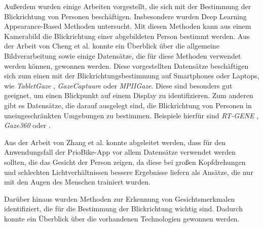 Außerdem wurden einige Arbeiten vorgestellt, die sich mit der Bestimmung der Blickrichtung von Personen beschäftigen. Insbesondere wurden Deep Learning Appearance-Based Methoden untersucht. Mit diesen Methoden kann aus einem Kamerabild die Blickrichtung einer abgebildeten Person bestimmt werden. Aus der Arbeit von Cheng et al. \cite{paper:basics:survey} konnte ein Überblick über die allgemeine Bildverarbeitung sowie einige Datensätze, die für diese Methoden verwendet werden können, gewonnen werden. Diese vorgestellten Datensätze beschäftigen sich zum einen mit der Blickrichtungsbestimmung auf Smartphones oder Laptops, wie \textit{TabletGaze} \cite{paper:tabletgaze}, \textit{GazeCaptuure} \cite{paper:gazecapture} oder \textit{MPIIGaze}. Diese sind besonders gut geeignet, um einen Blickpunkt auf einem Display zu identifizieren. Zum anderen gibt es Datensätze, die darauf ausgelegt sind, die Blickrichtung von Personen in uneingeschränkten Umgebungen zu bestimmen. Beispiele hierfür sind \textit{RT-GENE} \cite{paper:rt_gene}, \textit{Gaze360} \cite{paper:gaze360} oder \ethg \cite{paper:eth-xgaze}.

Aus der Arbeit von Zhang et al. \cite{paper:mpiifacegaze} konnte abgeleitet werden, dass für den Anwendungsfall der PrioBike-App vor allem Datensätze verwendet werden sollten, die das Gesicht der Person zeigen, da diese bei großen Kopfdrehungen und schlechten Lichtverhältnissen bessere Ergebnisse liefern als Ansätze, die nur mit den Augen des Menschen trainiert wurden.

Darüber hinaus wurden Methoden zur Erkennung von Gesichtsmerkmalen identifiziert, die für die Bestimmung der Blickrichtung wichtig sind. Dadurch konnte ein Überblick über die vorhandenen Technologien gewonnen werden. 



